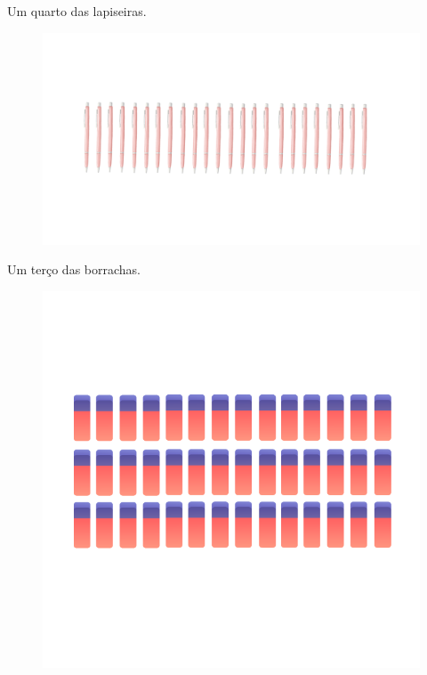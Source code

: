 \begin{escolha}
\item
  Um quarto das lapiseiras.

\begin{figure}[htpb!]
\includegraphics[width=\textwidth]{../ilustracoes/MAT5/SAEB_5ANO_MAT_figura70.png}
\end{figure}

\item
  Um terço das borrachas.

\begin{figure}[htpb!]
\includegraphics[width=\textwidth]{../ilustracoes/MAT5/SAEB_5ANO_MAT_figura71.png}
\end{figure}


\end{escolha}
